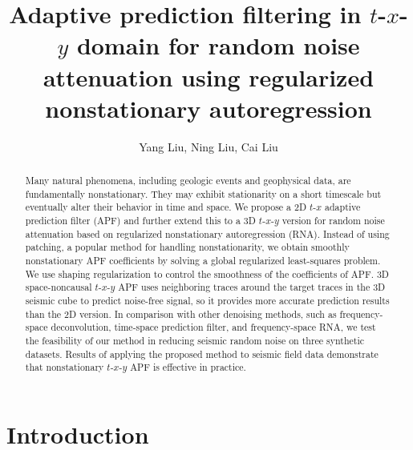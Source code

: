\title{Adaptive prediction filtering in $t$-$x$-$y$ domain for random noise attenuation using regularized nonstationary autoregression}

\renewcommand{\thefootnote}{\fnsymbol{footnote}}


\address{
\footnotemark[1] College of Geo-exploration Science and Technology,\\
Jilin University \\
No.938 Xi minzhu street \\
Changchun, China, 130026}

\author{Yang Liu\footnotemark[1], Ning Liu\footnotemark[1], Cai Liu\footnotemark[1]}

\maketitle

\begin{abstract}
Many natural phenomena, including geologic events and geophysical
data, are fundamentally nonstationary. They may exhibit stationarity
on a short timescale but eventually alter their behavior in time and
space. We propose a 2D $t$-$x$ adaptive prediction filter (APF) and
further extend this to a 3D $t$-$x$-$y$ version for random noise
attenuation based on regularized nonstationary autoregression
(RNA). Instead of using patching, a popular method for handling
nonstationarity, we obtain smoothly nonstationary APF coefficients by
solving a global regularized least-squares problem. We use shaping
regularization to control the smoothness of the coefficients of
APF. 3D space-noncausal $t$-$x$-$y$ APF uses neighboring traces around
the target traces in the 3D seismic cube to predict noise-free signal,
so it provides more accurate prediction results than the 2D
version. In comparison with other denoising methods, such as
frequency-space deconvolution, time-space prediction filter, and
frequency-space RNA, we test the feasibility of our method in reducing
seismic random noise on three synthetic datasets. Results of applying
the proposed method to seismic field data demonstrate that
nonstationary $t$-$x$-$y$ APF is effective in practice.

\end{abstract}

\section{Introduction}

